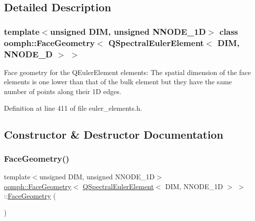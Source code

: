 \subsection{Detailed Description}
\subsubsection*{template$<$unsigned D\+IM, unsigned N\+N\+O\+D\+E\+\_\+1D$>$\newline
class oomph\+::\+Face\+Geometry$<$ Q\+Spectral\+Euler\+Element$<$ D\+I\+M, N\+N\+O\+D\+E\+\_\+D $>$ $>$}

Face geometry for the Q\+Euler\+Element elements\+: The spatial dimension of the face elements is one lower than that of the bulk element but they have the same number of points along their 1D edges. 

Definition at line 411 of file euler\+\_\+elements.\+h.



\subsection{Constructor \& Destructor Documentation}
\mbox{\label{classoomph_1_1FaceGeometry_3_01QSpectralEulerElement_3_01DIM_00_01NNODE__1D_01_4_01_4_ac68e4133f1164f81113d8928ede1f6ff}} 
\subsubsection{\texorpdfstring{Face\+Geometry()}{FaceGeometry()}}
{\footnotesize\ttfamily template$<$unsigned D\+IM, unsigned N\+N\+O\+D\+E\+\_\+1D$>$ \\
\hyperlink{classoomph_1_1FaceGeometry}{oomph\+::\+Face\+Geometry}$<$ \hyperlink{classoomph_1_1QSpectralEulerElement}{Q\+Spectral\+Euler\+Element}$<$ D\+IM, N\+N\+O\+D\+E\+\_\+1D $>$ $>$\+::\hyperlink{classoomph_1_1FaceGeometry}{Face\+Geometry} (\begin{DoxyParamCaption}{ }\end{DoxyParamCaption})\hspace{0.3cm}{\ttfamily [inline]}}



